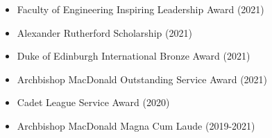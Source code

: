 \documentclass[10pt,a4paper,normalphoto]{altacv}
\begin{document}
\begin{paracol}{2}



\begin{itemize}
\item{Faculty of Engineering Inspiring Leadership Award (2021)}
\item{Alexander Rutherford Scholarship (2021)}\\
\item{Duke of Edinburgh International Bronze Award (2021)}
\item{Archbishop MacDonald Outstanding Service Award (2021)}
\item{Cadet League Service Award (2020)}
\item{Archbishop MacDonald Magna Cum Laude (2019-2021)}
\end{itemize}



\divider


\divider


\divider




\end{paracol}
\end{document}
